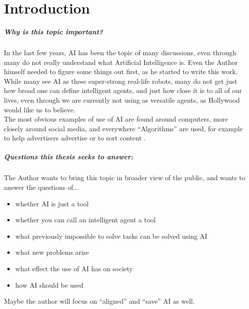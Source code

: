 \chapter{Introduction}
\paragraph{Why is this topic important?}
In the last few years, AI has been the topic of many discussions, even through many do not really understand what Artificial Intelligence is.
Even the Author himself needed to figure some things out first, as he started to write this work.\\
While many see AI as these super-strong real-life robots, many do not get just how broad one can define intelligent agents, and just how close it is to all of our lives, even through we are currently not using as versatile agents, as Hollywood would like us to believe.\\
The most obvious examples of use of AI are found around computers, more closely around social media, and everywhere “Algorithms” are used, for example to help advertisers advertise \cite{WerbungAufInstagram} or to sort content \cite{FunktioniertGoogleSucheSuchalgorithmen}.
\paragraph{Questions this thesis seeks to answer:}
The Author wants to bring this topic in broader view of the public, and wants to answer the questions of... 
\begin{itemize}
    \item whether AI is just a tool
    \item whether you can call an intelligent agent a tool
    \item what previously impossible to solve tasks can be solved using AI
    \item what new problems arise
    \item what effect the use of AI has on society
    \item how AI should be used
\end{itemize}
Maybe the author will focus on “aligned” and “save” AI as well.
